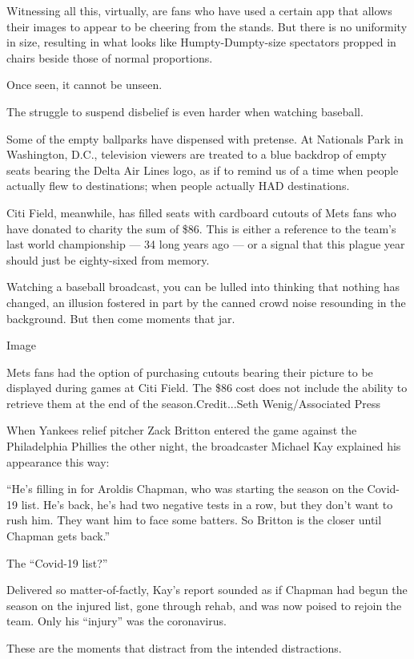 Witnessing all this, virtually, are fans who have used a certain app
that allows their images to appear to be cheering from the stands. But
there is no uniformity in size, resulting in what looks like
Humpty-Dumpty-size spectators propped in chairs beside those of normal
proportions.

Once seen, it cannot be unseen.

The struggle to suspend disbelief is even harder when watching baseball.

Some of the empty ballparks have dispensed with pretense. At Nationals
Park in Washington, D.C., television viewers are treated to a blue
backdrop of empty seats bearing the Delta Air Lines logo, as if to
remind us of a time when people actually flew to destinations; when
people actually HAD destinations.

Citi Field, meanwhile, has filled seats with cardboard cutouts of Mets
fans who have donated to charity the sum of \$86. This is either a
reference to the team's last world championship --- 34 long years ago
--- or a signal that this plague year should just be eighty-sixed from
memory.

Watching a baseball broadcast, you can be lulled into thinking that
nothing has changed, an illusion fostered in part by the canned crowd
noise resounding in the background. But then come moments that jar.

Image

Mets fans had the option of purchasing cutouts bearing their picture to
be displayed during games at Citi Field. The \$86 cost does not include
the ability to retrieve them at the end of the season.Credit...Seth
Wenig/Associated Press

When Yankees relief pitcher Zack Britton entered the game against the
Philadelphia Phillies the other night, the broadcaster Michael Kay
explained his appearance this way:

``He's filling in for Aroldis Chapman, who was starting the season on
the Covid-19 list. He's back, he's had two negative tests in a row, but
they don't want to rush him. They want him to face some batters. So
Britton is the closer until Chapman gets back.''

The ``Covid-19 list?''

Delivered so matter-of-factly, Kay's report sounded as if Chapman had
begun the season on the injured list, gone through rehab, and was now
poised to rejoin the team. Only his ``injury'' was the coronavirus.

These are the moments that distract from the intended distractions.

